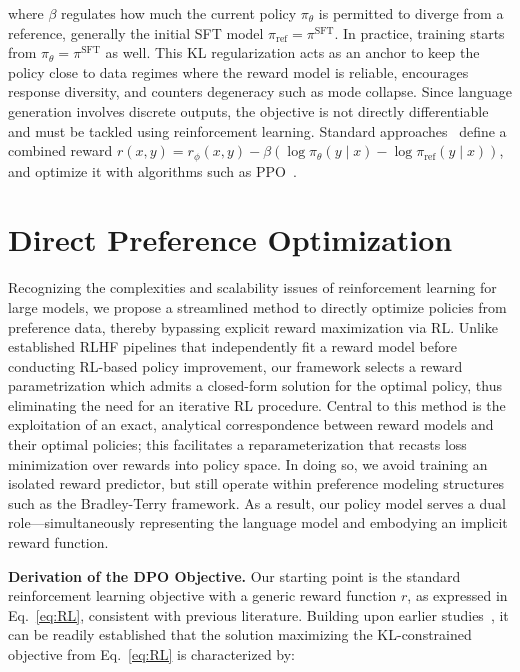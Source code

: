 where $\beta$ regulates how much the current policy $\pi_\theta$ is permitted to diverge from a reference, generally the initial SFT model $\pi_\text{ref} = \pi^\text{SFT}$. In practice, training starts from $\pi_\theta = \pi^\text{SFT}$ as well. This KL regularization acts as an anchor to keep the policy close to data regimes where the reward model is reliable, encourages response diversity, and counters degeneracy such as mode collapse. Since language generation involves discrete outputs, the objective is not directly differentiable and must be tackled using reinforcement learning. Standard approaches~\citep{ziegler2020finetuning, stiennon2022learning, bai2022training, ouyang2022training} define a combined reward ${r(x, y) = r_{\phi}(x, y) -\beta (\log \pi_{\theta}(y\mid x) - \log \pi_\text{ref}(y\mid x))}$, and optimize it with algorithms such as PPO~\cite{schulman2017proximal}.

\section{Direct Preference Optimization}\label{sec:DPO}

Recognizing the complexities and scalability issues of reinforcement learning for large models, we propose a streamlined method to directly optimize policies from preference data, thereby bypassing explicit reward maximization via RL. Unlike established RLHF pipelines that independently fit a reward model before conducting RL-based policy improvement, our framework selects a reward parametrization which admits a closed-form solution for the optimal policy, thus eliminating the need for an iterative RL procedure. Central to this method is the exploitation of an exact, analytical correspondence between reward models and their optimal policies; this facilitates a reparameterization that recasts loss minimization over rewards into policy space. In doing so, we avoid training an isolated reward predictor, but still operate within preference modeling structures such as the Bradley-Terry framework. As a result, our policy model serves a dual role—simultaneously representing the language model and embodying an implicit reward function.

\textbf{Derivation of the DPO Objective.} Our starting point is the standard reinforcement learning objective with a generic reward function $r$, as expressed in Eq.~\ref{eq:RL}, consistent with previous literature. Building upon earlier studies~\citep{peters2007reinforcement, peng2019advantage, korbak2022reinforcement, go2023aligning}, it can be readily established that the solution maximizing the KL-constrained objective from Eq.~\ref{eq:RL} is characterized by:

